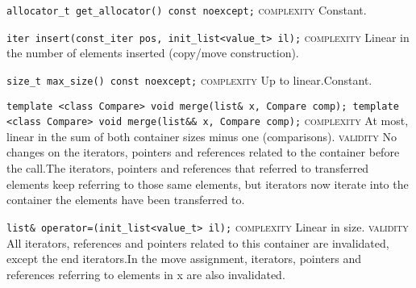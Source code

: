 \noindent{}\hspace*{0.25em}\lstinline[basicstyle=\ttfamily\color{cgreen}]{allocator_t get_allocator() const noexcept;} \textsc{complexity} Constant.\\\vspace{-0.6em}

\noindent{}\hspace*{0.25em}\lstinline[basicstyle=\ttfamily\color{corange}]{iter insert(const_iter pos, init_list<value_t> il);} \textsc{complexity} Linear in the number of elements inserted (copy/move construction).\\\vspace{-0.6em}

\noindent{}\hspace*{0.25em}\lstinline[basicstyle=\ttfamily\color{corange}]{size_t max_size() const noexcept;} \textsc{complexity} Up to linear.Constant.\\\vspace{-0.6em}

\noindent{}\hspace*{0.25em}\lstinline[basicstyle=\ttfamily\color{corange}]{template <class Compare> void merge(list& x, Compare comp); template <class Compare> void merge(list&& x, Compare comp);} \textsc{complexity} At most, linear in the sum of both container sizes minus one (comparisons). \textsc{validity} No changes on the iterators, pointers and references related to the container before the call.The iterators, pointers and references that referred to transferred elements keep referring to those same elements, but iterators now iterate into the container the elements have been transferred to.\\\vspace{-0.6em}

\noindent{}\hspace*{0.25em}\lstinline[basicstyle=\ttfamily\color{corange}]{list& operator=(init_list<value_t> il);} \textsc{complexity} Linear in size. \textsc{validity} All iterators, references and pointers related to this container are invalidated, except the end iterators.In the move assignment, iterators, pointers and references referring to elements in x are also invalidated.\\\vspace{-0.6em}

